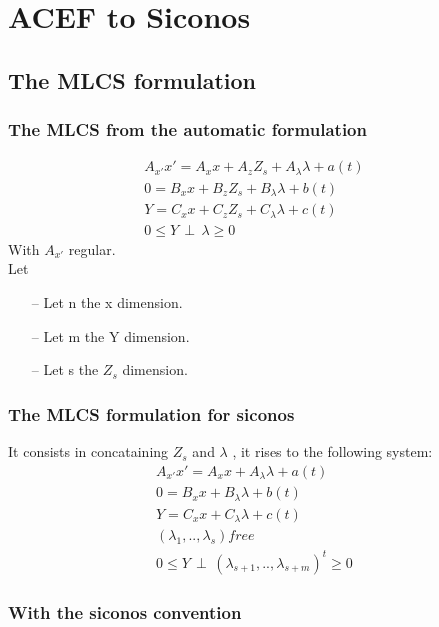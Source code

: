 
\newpage



\section{ACEF to Siconos}
\subsection{The MLCS formulation}
\subsubsection{The MLCS from the automatic formulation}
 \begin{eqnarray}
A_{x'}x'=A_{x}x +A_{z}Z_{s} +A_{\lambda} \lambda +a(t)&\label{eq2}\\
0=B_{x}x+B_{z}Z_{s} + B_{\lambda}\lambda + b(t)&\label{eq3}\\
Y=C_{x}x+C_{z}Z_{s}+C_{\lambda}\lambda + c(t) &\label{eq4}\\
0 \leq Y \, \perp \, \lambda \geq 0&\label{eqperp}
\end{eqnarray}
 With $A_{x'}$ regular.\\
 Let
 \begin{itemize}
  \item[--] Let n the x dimension.
  \item[--] Let m the Y dimension.
  \item[--] Let s the $Z_{s}$ dimension.
\end{itemize}
\subsubsection{The MLCS formulation for siconos}
It consists in concataining $Z_{s}$ and $ \lambda $ , it rises to the following system:
 \begin{eqnarray}
A_{x'}x'=A_{x}x +A_{\lambda} \lambda +a(t)&\label{eq2}\\
0=B_{x}x+ B_{\lambda}\lambda + b(t)&\label{eq3}\\
Y=C_{x}x+C_{\lambda}\lambda + c(t) &\label{eq4}\\
(\lambda_{1},..,\lambda_{s}) free\\
0 \leq Y \, \perp \, (\lambda_{s+1},..,\lambda_{s+m})^{t} \geq 0&\label{eqperp}
\end{eqnarray}


 \subsubsection{With the siconos convention}
 
